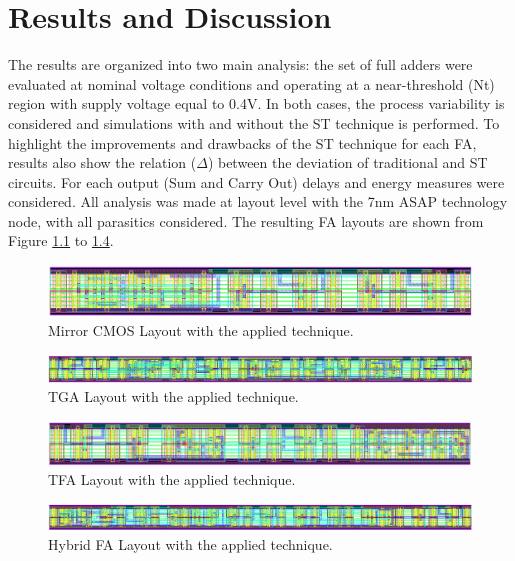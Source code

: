 \documentclass[ecp,tc, english]{iiufrgs}
\begin{document}
\chapter{Results and Discussion}

The results are organized into two main analysis: the set of full adders were evaluated at nominal voltage conditions and operating at a near-threshold (Nt) region with supply voltage equal to 0.4V. In both cases, the process variability is considered and simulations with and without the ST technique is performed. To highlight the improvements and drawbacks of the ST technique for each FA, results also show the relation (\(\Delta\)) between the deviation of traditional and ST circuits. For each output (Sum and Carry Out) delays and energy measures were considered. All analysis was made at layout level with the 7nm ASAP technology node, with all parasitics considered. The resulting FA layouts are shown from Figure \ref{fig:CMOSST} to \ref{fig:HYBRIDST}.

\begin{figure}[H]
\centering
\includegraphics[width=\textwidth]{CMOSST.png}
\caption{Mirror CMOS Layout with the applied technique.}
\label{fig:CMOSST}
\end{figure}

\begin{figure}[H]
\centering
\includegraphics[width=\textwidth]{TGAST.png}
\caption{TGA Layout with the applied technique.}
\label{fig:TGAST}
\end{figure}

\begin{figure}[H]
\centering
\includegraphics[width=\textwidth]{TFAST.png}
\caption{TFA Layout with the applied technique.}
\label{fig:TFAST}
\end{figure}

\begin{figure}[H]
\centering
\includegraphics[width=\textwidth]{HYBRIDST.png}
\caption{Hybrid FA Layout with the applied technique.}
\label{fig:HYBRIDST}
\end{figure}
\end{document}
